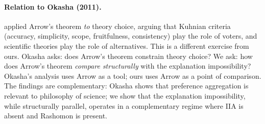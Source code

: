 \paragraph{Relation to Okasha (2011).}
\citet{okasha2011theory} applied Arrow's theorem \emph{to} theory
choice, arguing that Kuhnian criteria (accuracy, simplicity,
scope, fruitfulness, consistency) play the role of voters, and
scientific theories play the role of alternatives. This is a
different exercise from ours. Okasha asks: does Arrow's theorem
constrain theory choice? We ask: how does Arrow's theorem
\emph{compare structurally} with the explanation impossibility?
Okasha's analysis uses Arrow as a tool; ours uses Arrow as a
point of comparison. The findings are complementary: Okasha shows
that preference aggregation is relevant to philosophy of science;
we show that the explanation impossibility, while structurally
parallel, operates in a complementary regime where IIA is absent
and Rashomon is present.
